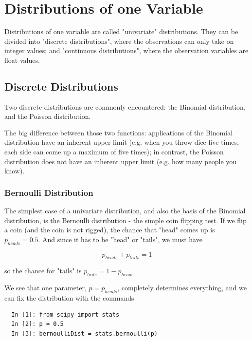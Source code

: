 \chapter{Distributions of one Variable}


Distributions of one variable are called "univariate" distributions. They can be divided into "discrete distributions", where the observations can only take on integer values; and "continuous distributions", where the observation variables are float values.

\section{Discrete Distributions}

Two discrete distributions are commonly encountered: the Binomial distribution, and the Poisson distribution.

The big difference between those two functions: applications of the Binomial distribution have an inherent upper limit (e.g. when you throw dice five times, each side can come up a maximum of five times); in contrast, the Poisson distribution does not have an inherent upper limit (e.g. how many people you know).

\subsection{Bernoulli Distribution}

The simplest case of a univariate distribution, and also the basis of the Binomial distribution, is the Bernoulli distribution - the simple coin flipping test. If we flip a coin (and the coin is not rigged), the chance that "head" comes up is $p_{heads}=0.5$. And since it has to be "head" or "tails", we must have

\begin{equation}\label{eq:Bernoulli}
  p_{heads} + p_{tails} = 1
\end{equation}

so the chance for "tails" is $p_{tails} = 1-p_{heads}$.

We see that one parameter, $p=p_{heads}$, completely determines everything, and we can fix the distribution with the commands

\begin{lstlisting}
  In [1]: from scipy import stats
  In [2]: p = 0.5
  In [3]: bernoulliDist = stats.bernoulli(p)
\end{lstlisting}

